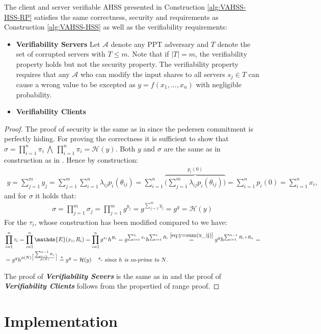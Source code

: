 \begin{thm}
The client and server verifiable AHSS presented in Construction \ref{alg:VAHSS-HSS-RP} satisfies the same correctness, security and requirements as Construction \ref{alg:VAHSS-HSS} as well as the verifiability requirements: 
\begin{itemize}
 \item \textbf{Verifiability Servers}  Let $\mathcal{A}$ denote any PPT  adversary and $T$ denote the set of corrupted servers with $T\leq m$. Note that if $|T|=m$, the verifiability property holds but not the security property. The verifiability property requires that any $\mathcal{A}$ who can modify the input shares to all servers $s_j\in T$ can cause a wrong value to be excepted as $y=f(x_1,...,x_n)$ with negligible probability.  
 \item  \textbf{Verifiability Clients} 
\end{itemize} 
\end{thm}
\begin{proof}
The proof of security is the same as in \cite{SumItUp} since the pedersen commitment is perfectly hiding. For proving the correctness it is sufficient to show that $\sigma= \prod_{i=1}^n \pi_i \:\bigwedge\: \prod_{i=1}^n \pi_i = \mathcal{H}(y)$. Both $y$ and $\sigma$ are the same as in construction as in \cite{VAHSS}. Hence by construction:
\begin{align}
    \label{eq:y=sum(x_ij)}
    y = \sum_{j=1}^m y_j= \sum_{j=1}^m \sum_{i=1}^n \lambda_{ij}p_i(\theta_{ij}) = \sum_{i=1}^n \overbrace{ \Big (\sum_{j=1}^m \lambda_{ij}p_i(\theta_{ij}) \Big)}^{ p_i(0)} = \sum_{i=1}^n p_i(0) = \sum_{i=1}^n x_i,
\end{align}
and for $\sigma$ it holds that:
\begin{align*}
    \sigma = \prod_{j=1}^m \sigma_j = \prod_{j=1}^m g^{y_j} = g^{\sum_{j=1}^my_j} =g^y = \mathcal{H}(y)
\end{align*}
For the $\tau_i$, whose construction has been modified compared to \cite{VAHSS} we have:
\begin{align*}
    &\prod_{i=1}^n \tau_i = \prod_{i=1}^n \mathds{E}(x_i,R_i)= \prod_{i=1}^n g^{x_i}h^{R_i} = g^{\sum_{i=1}^n x_i } h^{\sum_{i=1}^n R_i} \overset{\eqref{eq:y=sum(x_ij)}}{=} g^y h^{\sum_{i=1}^{n-1} R_i+R_n} = \\ 
    &= g^y h^{ \phi(N)\big\lceil \frac{\sum_{i=1}^{n-1}R_i}{\phi(N) }\big\rceil}  \overset{*}{=} g^y = \mathcal{H}(y) \quad \textit{*- since $h$ is co-prime to $N$.}
\end{align*}

The proof of \textit{\textbf{Verifiability Severs}} is the same as in \cite{SumItUp} and the proof of \textit{\textbf{Verifiability Clients}} follows from the propertied of range proof.
\end{proof}

\section{Implementation}